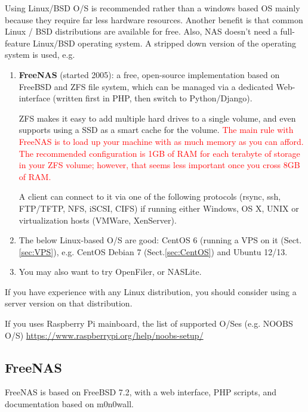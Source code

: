Using Linux/BSD O/S is recommended rather than a windows based OS mainly because
they require far less hardware resources. Another benefit is that common Linux /
BSD distributions are available for free.
Also, NAS doesn't need a full-feature Linux/BSD operating system. A stripped
down version of the operating system is used, e.g.
\begin{enumerate}
  \item {\bf FreeNAS} (started 2005): a free, open-source implementation based
  on FreeBSD and ZFS file system, which can be managed via a
  dedicated Web-interface (written first in PHP, then switch to Python/Django).  

 ZFS makes it easy to add multiple hard drives to a single volume, and even
supports using a SSD as a smart cache for the volume.
\textcolor{red}{The main rule with FreeNAS is to load up your machine with as
much memory as you can afford. The recommended configuration is 1GB of RAM for
each terabyte of storage in your ZFS volume; however, that seems less important
once you cross 8GB of RAM.}


 A client can connect to it via one of the following protocols (rsync, ssh,
FTP/TFTP, NFS, iSCSI, CIFS) if running either Windows, OS X, UNIX or
virtualization hosts (VMWare, XenServer).
  
  \item  The below Linux-based O/S are good: CentOS
6 (running a VPS on it (Sect.\ref{sec:VPS}), e.g. CentOS Debian 7
(Sect.\ref{sec:CentOS}) and Ubuntu 12/13.

  \item You may also want to try OpenFiler, or NASLite.
  
\end{enumerate}
If you have experience with any Linux distribution, you should consider using a
server version on that distribution.  

If you uses Raspberry Pi mainboard, the list of supported O/Ses (e.g. NOOBS O/S)
\url{https://www.raspberrypi.org/help/noobs-setup/}

\subsection{FreeNAS}
\label{sec:FreeNAS}


FreeNAS is based on FreeBSD 7.2,  with a web interface, PHP scripts, and
documentation based on m0n0wall.

